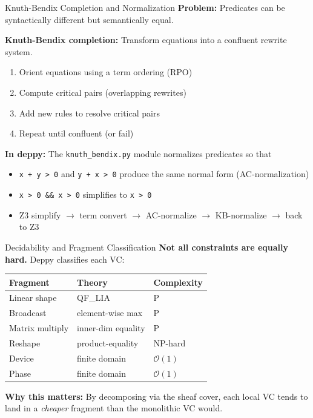 \documentclass[aspectratio=169,10pt]{beamer}
\begin{document}
\begin{frame}{Knuth-Bendix Completion and Normalization}
\textbf{Problem:} Predicates can be syntactically different but semantically equal.

\textbf{Knuth-Bendix completion:} Transform equations into a confluent rewrite system.
\begin{enumerate}
  \item Orient equations using a term ordering (RPO)
  \item Compute critical pairs (overlapping rewrites)
  \item Add new rules to resolve critical pairs
  \item Repeat until confluent (or fail)
\end{enumerate}

\vspace{0.3em}
\textbf{In deppy:} The \texttt{knuth\_bendix.py} module normalizes predicates so that
\begin{itemize}
  \item \texttt{x + y > 0} and \texttt{y + x > 0} produce the same normal form (AC-normalization)
  \item \texttt{x > 0 \&\& x > 0} simplifies to \texttt{x > 0}
  \item Z3 simplify $\to$ term convert $\to$ AC-normalize $\to$ KB-normalize $\to$ back to Z3
\end{itemize}
\end{frame}

\begin{frame}{Decidability and Fragment Classification}
\textbf{Not all constraints are equally hard.} Deppy classifies each VC:

\vspace{0.3em}
\renewcommand{\arraystretch}{1.3}
\begin{tabular}{@{}lll@{}}
\toprule
\textbf{Fragment} & \textbf{Theory} & \textbf{Complexity} \\
\midrule
Linear shape & QF\_LIA & P \\
Broadcast & element-wise max & P \\
Matrix multiply & inner-dim equality & P \\
Reshape & product-equality & NP-hard \\
Device & finite domain & $\mathcal{O}(1)$ \\
Phase & finite domain & $\mathcal{O}(1)$ \\
\bottomrule
\end{tabular}

\vspace{0.3em}
\textbf{Why this matters:} By decomposing via the sheaf cover, each local VC tends to land in a \emph{cheaper} fragment than the monolithic VC would.
\end{frame}
\end{document}
